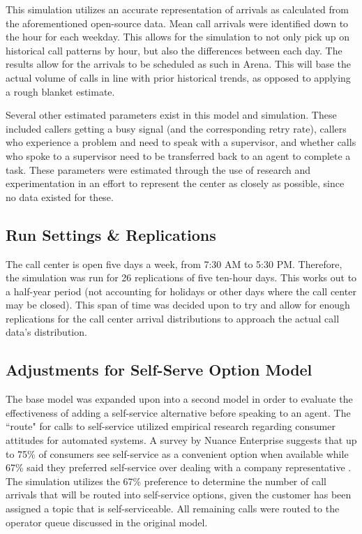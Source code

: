 \documentclass[12pt,twocolumn]{article}
\begin{document}
	
	This simulation utilizes an accurate representation of arrivals as calculated from the aforementioned open-source data.  Mean call arrivals were identified down to the hour for each weekday.  This allows for the simulation to not only pick up on historical call patterns by hour, but also the differences between each day.  The results allow for the arrivals to be scheduled as such in Arena.  This will base the actual volume of calls in line with prior historical trends, as opposed to applying a rough blanket estimate.
	
	\par
	
	Several other estimated parameters exist in this model and simulation.  These included callers getting a busy signal (and the corresponding retry rate), callers who experience a problem and need to speak with a supervisor, and whether calls who spoke to a supervisor need to be transferred back to an agent to complete a task.  These parameters were estimated through the use of research and experimentation in an effort to represent the center as closely as possible, since no data existed for these.
	
	\subsection{Run Settings \& Replications}
	
	 The call center is open five days a week, from 7:30 AM to 5:30 PM.  Therefore, the simulation was run for 26 replications of five ten-hour days.  This works out to a half-year period (not accounting for holidays or other days where the call center may be closed).  This span of time was decided upon to try and allow for enough replications for the call center arrival distributions to approach the actual call data's distribution.
	 
	 
	\subsection{Adjustments for Self-Serve Option Model}
	
	The base model was expanded upon into a second model in order to evaluate the effectiveness of adding a self-service alternative before speaking to an agent.  The ``route" for calls to self-service utilized empirical research regarding consumer attitudes for automated systems.  A survey by Nuance Enterprise suggests that up to 75\% of consumers see self-service as a convenient option when available while 67\% said they preferred self-service over dealing with a company representative \cite{webblog}.  The simulation utilizes the 67\% preference to determine the number of call arrivals that will be routed into self-service options, given the customer has been assigned a topic that is self-serviceable.  All remaining calls were routed to the operator queue discussed in the original model.
\end{document}
